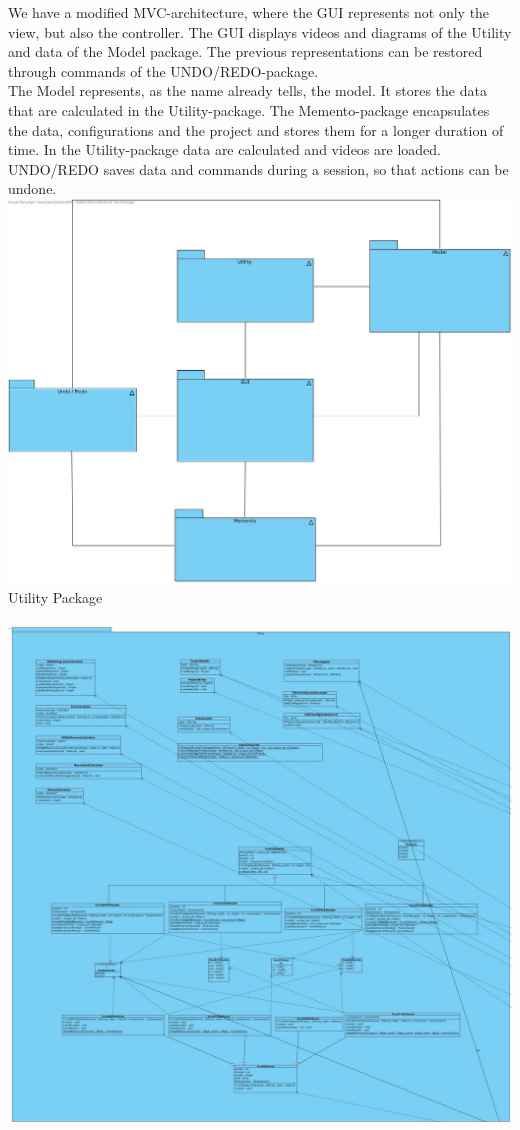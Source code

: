 \documentclass[twoside]{book}
\newcommand{\+}{\discretionary{\mbox{\scriptsize$\hookleftarrow$}}{}{}}
\begin{document}
We have a modified MVC-architecture, where the GUI represents not only the view, but also the controller. The GUI displays videos and diagrams of the Utility and data of the Model package.
The previous representations can be restored through commands of the UNDO/REDO-package.\\

The Model represents, as the name already tells, the model. It stores the data that are calculated in the Utility-package. 
The Memento-package encapsulates the data, configurations and the project and stores them for a longer duration of time. 
In the Utility-package data are calculated and videos are loaded.
UNDO/REDO saves data and commands during a session, so that actions can be undone.
\\
{\centering\includegraphics[width=1\textwidth]{Grobuebersicht.jpg}}\\
\newpage
Utility Package\\\\
{\centering\includegraphics[width=1\textwidth]{Utility.jpg}}\\
\end{document}
